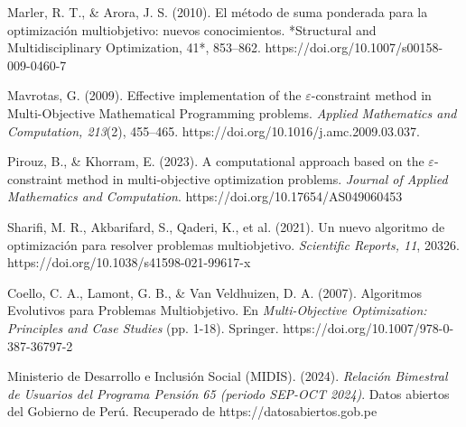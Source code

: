 \documentclass[12pt]{article}
\begin{document}
\begin{thebibliography}{99}
Marler, R. T., \& Arora, J. S. (2010). El método de suma ponderada para la optimización multiobjetivo: nuevos conocimientos. *Structural and Multidisciplinary Optimization, 41*, 853–862. https://doi.org/10.1007/s00158-009-0460-7

Mavrotas, G. (2009). Effective implementation of the $\varepsilon$-constraint method in Multi-Objective Mathematical Programming problems. \textit{Applied Mathematics and Computation, 213}(2), 455–465. https://doi.org/10.1016/j.amc.2009.03.037.

Pirouz, B., \& Khorram, E. (2023). A computational approach based on the $\varepsilon$-constraint method in multi-objective optimization problems. \textit{Journal of Applied Mathematics and Computation}. https://doi.org/10.17654/AS049060453

Sharifi, M. R., Akbarifard, S., Qaderi, K., et al. (2021). Un nuevo algoritmo de optimización para resolver problemas multiobjetivo. \textit{Scientific Reports, 11}, 20326. 
https://doi.org/10.1038/s41598-021-99617-x

Coello, C. A., Lamont, G. B., \& Van Veldhuizen, D. A. (2007). Algoritmos Evolutivos para Problemas Multiobjetivo. En \textit{Multi-Objective Optimization: Principles and Case Studies} (pp. 1-18). Springer. https://doi.org/10.1007/978-0-387-36797-2

Ministerio de Desarrollo e Inclusión Social (MIDIS). (2024). \textit{Relación Bimestral de Usuarios del Programa Pensión 65 (periodo SEP-OCT 2024)}. Datos abiertos del Gobierno de Perú. Recuperado de https://datosabiertos.gob.pe

\end{thebibliography}
\end{document}
